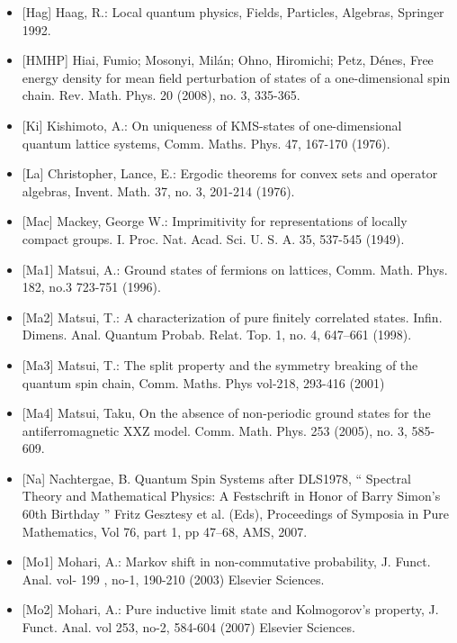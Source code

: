 \documentclass[a4paper,Haag duality]{mathscan}
\theoremstyle{definition}
\begin{document}
\begin{itemize}
\item{[Hag]} Haag, R.: Local quantum physics, Fields, Particles, Algebras, Springer 1992. 

\item{[HMHP]} Hiai, Fumio; Mosonyi, Milán; Ohno, Hiromichi; Petz, Dénes, Free energy density for mean field perturbation of states of a one-dimensional spin chain. Rev. Math. Phys. 20 (2008), no. 3, 335-365. 

\item{[Ki]} Kishimoto, A.: On uniqueness of KMS-states of one-dimensional quantum lattice systems, Comm. Maths. Phys. 47, 167-170 (1976).

\item{[La]} Christopher, Lance, E.: Ergodic theorems for convex sets and operator algebras, Invent. Math. 37, no. 3, 201-214 (1976). 

\item{[Mac]} Mackey, George W.: Imprimitivity for representations of locally compact groups. I. Proc. Nat. Acad. Sci. U. S. A. 35, 
537-545 (1949). 

\item{[Ma1]} Matsui, A.: Ground states of fermions on lattices, Comm. Math. Phys. 182, no.3 723-751 (1996). 

\item{[Ma2]} Matsui, T.: A characterization of pure finitely correlated states. 
Infin. Dimens. Anal. Quantum Probab. Relat. Top. 1, no. 4, 647--661 (1998).

\item{[Ma3]} Matsui, T.: The split property and the symmetry breaking of the quantum spin chain, Comm. 
Maths. Phys vol-218, 293-416 (2001) 

\item{[Ma4]} Matsui, Taku, On the absence of non-periodic ground states for the antiferromagnetic XXZ model. Comm. Math. Phys. 253 (2005), no. 3, 585-609.

\item{[Na]} Nachtergae, B. Quantum Spin Systems after DLS1978, `` Spectral Theory and Mathematical Physics: A Festschrift in Honor of Barry Simon's 60th Birthday '' Fritz Gesztesy et al. (Eds), 
Proceedings of Symposia in Pure Mathematics, Vol 76, part 1, pp 47--68, AMS, 2007. 


\item{[Mo1]} Mohari, A.: Markov shift in non-commutative probability, J. Funct. Anal. vol- 199 
, no-1, 190-210 (2003) Elsevier Sciences. 

\item{[Mo2]} Mohari, A.: Pure inductive limit state and Kolmogorov's property, J. Funct. Anal. vol 253, no-2, 584-604 (2007)
Elsevier Sciences.


\end{itemize}
\end{document}

